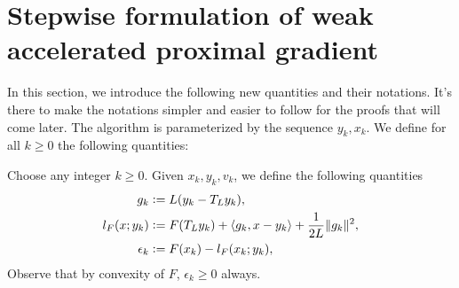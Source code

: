 \documentclass[12pt]{article}
\begin{document}
\section{Stepwise formulation of weak accelerated proximal gradient}
    In this section, we introduce the following new quantities and their notations. 
    It's there to make the notations simpler and easier to follow for the proofs that will come later. 
    The algorithm is parameterized by the sequence $y_k, x_k$. 
    We define for all $k \ge 0$ the following quantities: 
    \begin{assumption}
        Choose any integer $k\ge 0$. 
        Given $x_k, y_k, v_k$, we define the following quantities
        \begin{align}
            g_k &\vcentcolon= L(y_k - T_L y_k), 
            \label{eqn:grad-map}
            \\
            l_F(x; y_k) &\vcentcolon= F(T_Ly_k) + \langle g_k, x - y_k\rangle + \frac{1}{2L}\Vert g_k\Vert^2, 
            \label{eqn:lower-linearization}
            \\
            \epsilon_{k} &\vcentcolon= F(x_k) - l_F(x_k; y_k), 
            \label{eqn:regret}
        \end{align}
        Observe that by convexity of $F$, $\epsilon_k \ge 0$ always. 
    \end{assumption}
\end{document}
